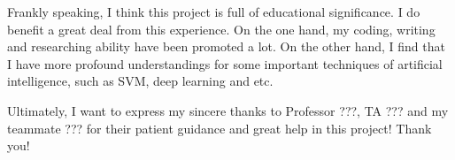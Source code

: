 \documentclass[10pt,twocolumn,letterpaper]{article}
\begin{document}
	Frankly speaking, I think this project is full of educational significance. I do benefit a great deal from this experience. On the one hand, my coding, writing and researching ability have been promoted a lot. On the other hand, I find that I have more profound understandings for some important techniques of artificial intelligence, such as SVM, deep learning and etc.
	
	Ultimately, I want to express my sincere thanks to Professor ???, TA ??? and my teammate ??? for their patient guidance and great help in this project! Thank you!
{\small
\nocite{*}


}
\end{document}
